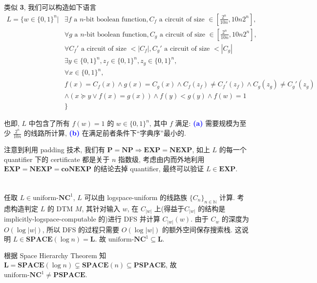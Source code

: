 \documentclass[8pt]{article}
\theoremstyle{compact}
\def\num#1{\textnormal{\textbf{\mbox{\textcolor{blue}{(#1)}}}}}
\begin{document}
\section{}
类似 \textbf{3}, 我们可以构造如下语言\begin{equation*}
	\begin{split}
		L = \{w \in \{0, 1\}^n | &\exists f \text{ a } n \text{-bit boolean function}, C_f \text{ a circuit of size } \in \left[\frac{2^n}{10n}, 10n2^n\right], \\
		&\forall g \text{ a } n \text{-bit boolean function}, C_g \text{ a circuit of size } \in \left[\frac{2^n}{10n}, 10n2^n\right], \\ &\forall C_f' \text{ a circuit of size } < |C_f|, C_g' \text{ a circuit of size } < |C_g|\\
		&\exists y \in \{0, 1\}^n, z_f \in \{0, 1\}^n, z_g \in \{0, 1\}^n,\\
		&\forall x \in \{0, 1\}^n, \\
		&f(x) = C_f(x) \wedge g(x) = C_g(x) \wedge C_f(z_f) \neq C_f'(z_f) \wedge C_g(z_g) \neq C_g'(z_g) \\ &\wedge(x \succcurlyeq y \vee f(x) = g(x)) \wedge f(y) < g(y) \wedge f(w) = 1\\
		&\}
	\end{split}
\end{equation*}

也即, $L$ 中包含了所有 $f(w) = 1$ 的 $w \in \{0, 1\}^n$, 其中 $f$ 满足: \num{a} 需要规模为至少 $\frac{2^n}{10n}$ 的线路所计算, \num{b} 在满足前者条件下“字典序”最小的. 

注意到利用 padding 技术, 我们有 $\textbf{P} = \textbf{NP} \Rightarrow \textbf{EXP} = \textbf{NEXP}$, 如上 $L$ 的每一个 quantifier 下的 certificate 都是关于 $n$ 指数级, 考虑由内而外地利用 $\textbf{EXP} = \textbf{NEXP} = \textbf{coNEXP}$ 的结论去掉 quantifier, 最终可以验证 $L \in \textbf{EXP}$.

\section{}
任取 $L \in \text{uniform-}\textbf{NC}^1$, $L$ 可以由 logspace-uniform 的线路族 $\{C_n\}_{n \in \mathbb N}$ 计算. 考虑构造判定 $L$ 的 DTM $M$, 其针对输入 $w$, 在 $C_{|w|}$ 上(得益于$C_{|w|}$ 的结构是 implicitly-logspace-computable 的)进行 DFS 并计算 $C_{|w|}(w)$. 由于 $C_w$ 的深度为 $O(\log |w|)$, 所以 DFS 的过程只需要 $O(\log |w|)$ 的额外空间保存搜索栈. 这说明 $L \in \textbf{SPACE}(\log n) = \textbf{L}$. 故 $\text{uniform-}\textbf{NC}^1 \subseteq \textbf{L}$.

根据 Space Hierarchy Theorem 知 $\textbf{L} = \textbf{SPACE}(\log n) \subsetneq \textbf{SPACE}(n) \subseteq \textbf{PSPACE}$, 故 $\text{uniform-}\textbf{NC}^1 \neq \textbf{PSPACE}$.
\end{document}
